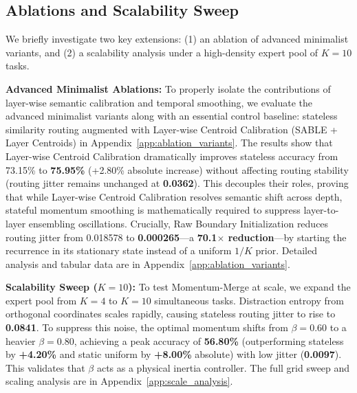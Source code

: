 \subsection{Ablations and Scalability Sweep}
\label{sec:ablations_scalability}

We briefly investigate two key extensions: (1) an ablation of advanced minimalist variants, and (2) a scalability analysis under a high-density expert pool of $K=10$ tasks.

\textbf{Advanced Minimalist Ablations:} To properly isolate the contributions of layer-wise semantic calibration and temporal smoothing, we evaluate the advanced minimalist variants along with an essential control baseline: stateless similarity routing augmented with Layer-wise Centroid Calibration (SABLE + Layer Centroids) in Appendix~\ref{app:ablation_variants}. The results show that Layer-wise Centroid Calibration dramatically improves stateless accuracy from 73.15\% to \textbf{75.95\%} (+2.80\% absolute increase) without affecting routing stability (routing jitter remains unchanged at \textbf{0.0362}). This decouples their roles, proving that while Layer-wise Centroid Calibration resolves semantic shift across depth, stateful momentum smoothing is mathematically required to suppress layer-to-layer ensembling oscillations. Crucially, Raw Boundary Initialization reduces routing jitter from 0.018578 to \textbf{0.000265}---a \textbf{70.1$\times$ reduction}---by starting the recurrence in its stationary state instead of a uniform $1/K$ prior. Detailed analysis and tabular data are in Appendix~\ref{app:ablation_variants}.

\textbf{Scalability Sweep ($K=10$):} To test Momentum-Merge at scale, we expand the expert pool from $K=4$ to $K=10$ simultaneous tasks. Distraction entropy from orthogonal coordinates scales rapidly, causing stateless routing jitter to rise to \textbf{0.0841}. To suppress this noise, the optimal momentum shifts from $\beta = 0.60$ to a heavier \textbf{$\beta = 0.80$}, achieving a peak accuracy of \textbf{56.80\%} (outperforming stateless by \textbf{+4.20\%} and static uniform by \textbf{+8.00\%} absolute) with low jitter (\textbf{0.0097}). This validates that $\beta$ acts as a physical inertia controller. The full grid sweep and scaling analysis are in Appendix~\ref{app:scale_analysis}.
